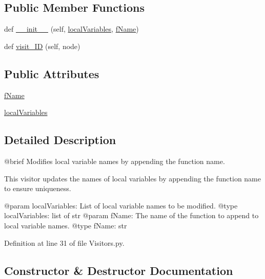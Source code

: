\subsection*{Public Member Functions}
\begin{DoxyCompactItemize}
\item 
def \hyperlink{classVisitors_1_1LocalVariablesModifier_a914dde44586c626013d9734045573409}{\+\_\+\+\_\+init\+\_\+\+\_\+} (self, \hyperlink{classVisitors_1_1LocalVariablesModifier_af117185a96147e67251924514b93a25e}{local\+Variables}, \hyperlink{classVisitors_1_1LocalVariablesModifier_a5a5ccf2ed83be1d582eba6e7797690a5}{f\+Name})
\item 
def \hyperlink{classVisitors_1_1LocalVariablesModifier_a876b22ca4502c2197e9881ebf8fb6288}{visit\+\_\+\+ID} (self, node)
\end{DoxyCompactItemize}
\subsection*{Public Attributes}
\begin{DoxyCompactItemize}
\item 
\hyperlink{classVisitors_1_1LocalVariablesModifier_a5a5ccf2ed83be1d582eba6e7797690a5}{f\+Name}
\item 
\hyperlink{classVisitors_1_1LocalVariablesModifier_af117185a96147e67251924514b93a25e}{local\+Variables}
\end{DoxyCompactItemize}


\subsection{Detailed Description}
\begin{DoxyVerb}@brief Modifies local variable names by appending the function name.

This visitor updates the names of local variables by appending the function name to ensure uniqueness.

@param localVariables: List of local variable names to be modified.
@type localVariables: list of str
@param fName: The name of the function to append to local variable names.
@type fName: str
\end{DoxyVerb}
 

Definition at line 31 of file Visitors.\+py.



\subsection{Constructor \& Destructor Documentation}
\mbox{\label{classVisitors_1_1LocalVariablesModifier_a914dde44586c626013d9734045573409}} 
